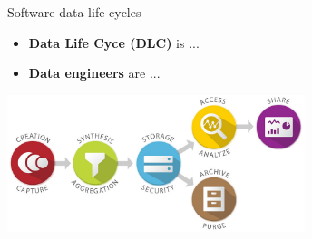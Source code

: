 \begin{frame}{Software data life cycles}%
\begin{itemize}
\item \textbf{Data Life Cyce (DLC)} is ...
\item \textbf{Data engineers} are ...
\end{itemize}

\vspace{-1ex}
\centering
\includegraphics[width=0.65\textwidth]{pics/data_lifecycle_illust.jpg}
\end{frame}

